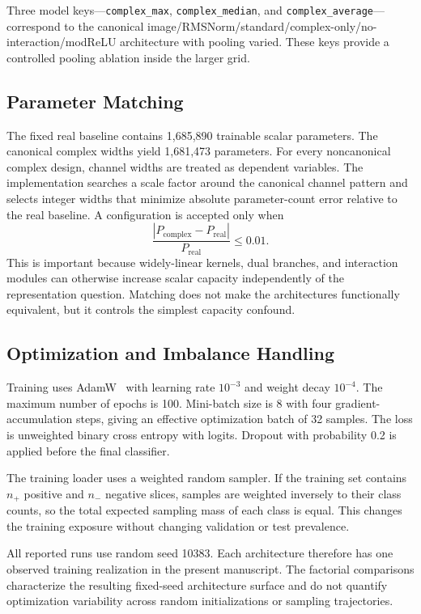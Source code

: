 Three model keys---\texttt{complex\_max}, \texttt{complex\_median}, and \texttt{complex\_average}---correspond to the canonical image/RMSNorm/standard/complex-only/no-interaction/modReLU architecture with pooling varied. These keys provide a controlled pooling ablation inside the larger grid.



\subsection{Parameter Matching}
The fixed real baseline contains 1,685,890 trainable scalar parameters. The canonical complex widths yield 1,681,473 parameters. For every noncanonical complex design, channel widths are treated as dependent variables. The implementation searches a scale factor around the canonical channel pattern and selects integer widths that minimize absolute parameter-count error relative to the real baseline. A configuration is accepted only when
\begin{equation}
\frac{|P_{\mathrm{complex}}-P_{\mathrm{real}}|}{P_{\mathrm{real}}}\le0.01.
\label{eq:param-match}
\end{equation}
This is important because widely-linear kernels, dual branches, and interaction modules can otherwise increase scalar capacity independently of the representation question. Matching does not make the architectures functionally equivalent, but it controls the simplest capacity confound.

\subsection{Optimization and Imbalance Handling}
Training uses AdamW~\cite{Loshchilov2019AdamW} with learning rate $10^{-3}$ and weight decay $10^{-4}$. The maximum number of epochs is 100. Mini-batch size is 8 with four gradient-accumulation steps, giving an effective optimization batch of 32 samples. The loss is unweighted binary cross entropy with logits. Dropout with probability 0.2 is applied before the final classifier.

The training loader uses a weighted random sampler. If the training set contains $n_+$ positive and $n_-$ negative slices, samples are weighted inversely to their class counts, so the total expected sampling mass of each class is equal. This changes the training exposure without changing validation or test prevalence.

All reported runs use random seed 10383. Each architecture therefore has one observed training realization in the present manuscript. The factorial comparisons characterize the resulting fixed-seed architecture surface and do not quantify optimization variability across random initializations or sampling trajectories.

